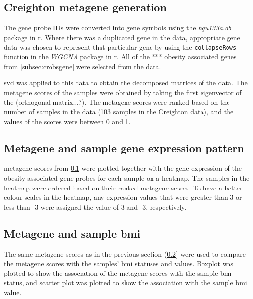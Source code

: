 \subsection{Creighton metagene generation}
\label{subsec:crmetagen}

The gene probe IDs were converted into gene symbols using the \textit{hgu133a.db} package in \gls{r}.
Where there was a duplicated gene in the data, appropriate gene data was chosen to represent that particular gene by using the \texttt{collapseRows} function in the \textit{WGCNA} package in \gls{r}.
All of the *** obesity associated genes from  \cref{subsec:crobsgene} were selected from the data.

\gls{svd} was applied to this data to obtain the decomposed matrices of the data.
The \gls{metagene} scores of the samples were obtained by taking the first eigenvector of the (orthogonal matrix...?).
The \gls{metagene} scores were ranked based on the number of samples in the data (103 samples in the Creighton data), and the values of the scores were between 0 and 1.

\subsection{Metagene and sample gene expression pattern}
\label{subsec:crmetage}

\Gls{metagene} scores from \cref{subsec:crmetagen} were plotted together with the gene expression of the obesity associated gene probes for each sample on a heatmap.
The samples in the heatmap were ordered based on their ranked \gls{metagene} scores.
To have a better colour scales in the heatmap, any expression values that were greater than 3 or less than -3 were assigned the value of 3 and -3, respectively.

\subsection{Metagene and sample \gls{bmi}}
\label{subsec:crmetabmi}

The same \gls{metagene} scores as in the previous section (\cref{subsec:crmetage}) were used to compare the \gls{metagene} scores with the samples' \gls{bmi} statuses and values.
Boxplot was plotted to show the association of the \gls{metagene} scores with the sample \gls{bmi} status, and scatter plot was plotted to show the association with the sample \gls{bmi} value.

